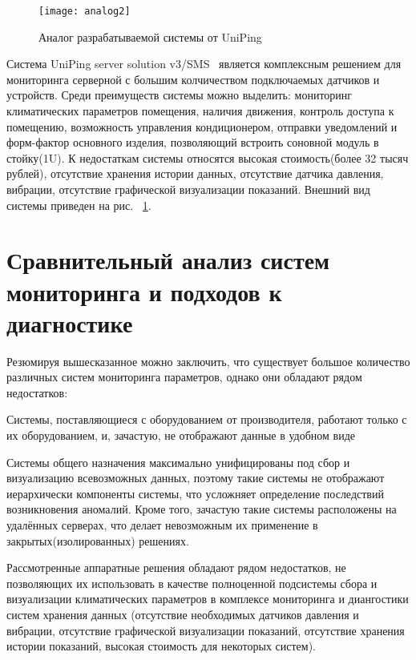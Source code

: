 \begin{figure}[!h]
	\centering
	\texttt{[image: analog2]}
	\caption{Аналог разрабатываемой системы от  UniPing}
	\label{fig:analog2}
\end{figure}

Система UniPing server solution v3/SMS~\cite{analog2} является комплексным решением для мониторинга серверной с большим колчичеством подключаемых датчиков и устройств. Среди преимуществ системы можно выделить: мониторинг климатических параметров помещения, наличия движения, контроль доступа к помещению, возможность управления кондиционером, отправки уведомлений и форм-фактор основного изделия, позволяющий встроить  соновной модуль в стойку(1U). К недостаткам системы относятся высокая стоимость(более 32 тысяч рублей), отсутствие хранения истории данных, отсутствие датчика давления, вибрации, отсутствие графической визуализации показаний. Внешний вид системы приведен на рис. ~\ref{fig:analog2}.  

\section{Сравнительный анализ систем мониторинга и подходов к диагностике}

Резюмируя вышесказанное можно заключить, что существует большое количество различных систем мониторинга параметров, однако они обладают рядом недостатков:
\begin{itemize*}
	\item{Системы, поставляющиеся с оборудованием от производителя, работают только с их оборудованием, и, зачастую, не отображают данные в удобном виде}
	\item{Системы общего назначения максимально унифицированы под сбор и визуализацию всевозможных данных, поэтому такие системы не отображают иерархически компоненты системы, что усложняет определение последствий возникновения аномалий.  Кроме того, зачастую такие системы расположены на удалённых серверах, что делает невозможным их применение в закрытых(изолированных) решениях.}
\end{itemize*}

Рассмотренные аппаратные решения обладают рядом недостатков, не позволяющих их использовать в качестве полноценной подсистемы сбора и визуализации климатических параметров в комплексе мониторинга и диангостики систем хранения данных (отсутствие необходимых датчиков давления и вибрации, отсутствие графической визуализации показаний, отсутствие хранения истории показаний, высокая стоимость для некоторых систем).

